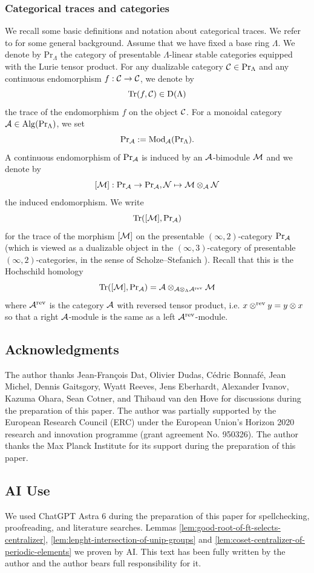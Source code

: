 \documentclass[article, 10pt, oneside, reqno]{amsart}
\theoremstyle{plain}
\theoremstyle{definition}
\theoremstyle{remark}
\newcommand{\Prr}{\mathrm{Pr}}
\begin{document}
\subsubsection{Categorical traces and categories}
We recall some basic definitions and notation about categorical traces. We refer to \cite{ToyModel, ZhuCategoricalTame, HoyoisScherotzkeSibilla} for some general background. Assume that we have fixed a base ring $\Lambda$. We denote by $\Prr_{\Lambda}$ the category of presentable $\Lambda$-linear stable categories equipped with the Lurie tensor product. For any dualizable category $\Ccal \in \Prr_{\Lambda}$ and any continuous endomorphism $f : \mathcal{C} \to \mathcal{C}$, we denote by 
$$\mathrm{Tr}(f, \mathcal{C}) \in \mathrm{D}(\Lambda)$$
the trace of the endomorphism $f$ on the object $\mathcal{C}$. For a monoidal category $\Acal \in \Alg(\Prr_{\Lambda})$, we set 
$$\Prr_{\Acal} := \Mod_{\Acal}(\Prr_{\Lambda}).$$
A continuous endomorphism of $\Prr_{\Acal}$ is induced by an $\mathcal{A}$-bimodule $\mathcal{M}$ and we denote by 
$$[\Mcal] : \Prr_{\Acal} \to \Prr_{\Acal}, \Ncal \mapsto \Mcal \otimes_{\Acal} \Ncal$$ 
the induced endomorphism. 
We write
$$\Tr([\Mcal], \Prr_{\Acal})$$
for the trace of the morphism $[\mathcal{M}]$ on the presentable $(\infty, 2)$-category $\Prr_{\Acal}$ (which is viewed as a dualizable object in the $(\infty,3)$-category of presentable $(\infty, 2)$-categories, in the sense of Scholze--Stefanich \cite{ScholzeStefanich, Stefanich}). Recall that this is the Hochschild homology 
$$\Tr([\Mcal], \Prr_{\Acal}) = \Acal \otimes_{\Acal \otimes_{\Lambda} \Acal^{\rev}} \Mcal$$
where $\mathcal{A}^{\mathrm{rev}}$ is the category $\mathcal{A}$ with reversed tensor product, i.e. $x \otimes^{\mathrm{rev}} y = y \otimes x$ so that a right $\mathcal{A}$-module is the same as a left $\mathcal{A}^{\mathrm{rev}}$-module. 

\subsection{Acknowledgments}
The author thanks Jean-François Dat, Olivier Dudas, Cédric Bonnafé, Jean Michel, Dennis Gaitsgory, Wyatt Reeves, Jens Eberhardt, Alexander Ivanov, Kazuma Ohara, Sean Cotner, and Thibaud van den Hove for discussions during the preparation of this paper.
The author was partially supported by the European Research Council (ERC) under the European Union's Horizon 2020 research and innovation programme (grant agreement No. 950326). The author thanks the Max Planck Institute for its support during the preparation of this paper. 

\subsection{AI Use} We used ChatGPT Astra 6 during the preparation of this paper for spellchecking, proofreading, and literature searches. Lemmas \ref{lem:good-root-of-ft-selects-centralizer}, \ref{lem:lenght-intersection-of-unip-groups} and \ref{lem:coset-centralizer-of-periodic-elements} we proven by AI.  This text has been fully written by the author and the author bears full responsibility for it. 
\end{document}
